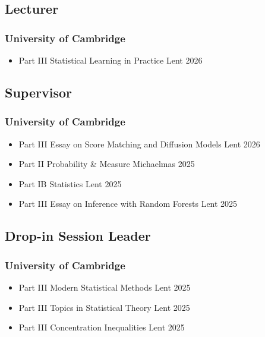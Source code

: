 \documentclass{wgu-cv}
\begin{document}
\subsection{Lecturer}{}
\subsubsection{University of Cambridge}

\begin{itemize}

  \item Part III Statistical Learning in Practice
    \hfill Lent 2026

\end{itemize}

\subsection{Supervisor}{}
\subsubsection{University of Cambridge}

\begin{itemize}

  \item
    Part III Essay on Score Matching and Diffusion Models
    \hfill Lent 2026

  \item
    Part II Probability \& Measure
    \hfill Michaelmas 2025

  \item
    Part IB Statistics
    \hfill Lent 2025

  \item
    Part III Essay on Inference with Random Forests
    \hfill Lent 2025

\end{itemize}

\subsection{Drop-in Session Leader}{}
\subsubsection{University of Cambridge}

\begin{itemize}

  \item
    Part III Modern Statistical Methods
    \hfill Lent 2025

  \item
    Part III Topics in Statistical Theory
    \hfill Lent 2025

  \item
    Part III Concentration Inequalities
    \hfill Lent 2025

\end{itemize}
\end{document}
